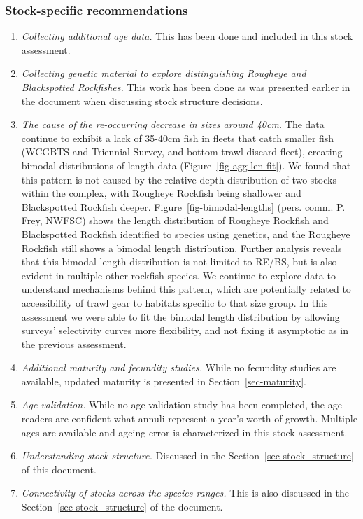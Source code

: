 \documentclass[
]{scrartcl}
\providecommand{\tightlist}{%
  \setlength{\itemsep}{0pt}\setlength{\parskip}{0pt}}\usepackage{longtable,booktabs,array}
\begin{document}
\subsubsection{Stock-specific
recommendations}\label{stock-specific-recommendations}

\begin{enumerate}
\def\labelenumi{\arabic{enumi}.}
\tightlist
\item
  \emph{Collecting additional age data.} This has been done and included
  in this stock assessment.
\item
  \emph{Collecting genetic material to explore distinguishing Rougheye
  and Blackspotted Rockfishes.} This work has been done as was presented
  earlier in the document when discussing stock structure decisions.
\item
  \emph{The cause of the re-occurring decrease in sizes around 40cm.}
  The data continue to exhibit a lack of 35-40cm fish in fleets that
  catch smaller fish (WCGBTS and Triennial Survey, and bottom trawl
  discard fleet), creating bimodal distributions of length data
  (Figure~\ref{fig-agg-len-fit}). We found that this pattern is not
  caused by the relative depth distribution of two stocks within the
  complex, with Rougheye Rockfish being shallower and Blackspotted
  Rockfish deeper. Figure~\ref{fig-bimodal-lengths} (pers. comm. P.
  Frey, NWFSC) shows the length distribution of Rougheye Rockfish and
  Blackspotted Rockfish identified to species using genetics, and the
  Rougheye Rockfish still shows a bimodal length distribution. Further
  analysis reveals that this bimodal length distribution is not limited
  to RE/BS, but is also evident in multiple other rockfish species. We
  continue to explore data to understand mechanisms behind this pattern,
  which are potentially related to accessibility of trawl gear to
  habitats specific to that size group. In this assessment we were able
  to fit the bimodal length distribution by allowing surveys'
  selectivity curves more flexibility, and not fixing it asymptotic as
  in the previous assessment.
\item
  \emph{Additional maturity and fecundity studies.} While no fecundity
  studies are available, updated maturity is presented in
  Section~\ref{sec-maturity}.
\item
  \emph{Age validation.} While no age validation study has been
  completed, the age readers are confident what annuli represent a
  year's worth of growth. Multiple ages are available and ageing error
  is characterized in this stock assessment.
\item
  \emph{Understanding stock structure.} Discussed in the
  Section~\ref{sec-stock_structure} of this document.
\item
  \emph{Connectivity of stocks across the species ranges.} This is also
  discussed in the Section~\ref{sec-stock_structure} of the document.
\end{enumerate}
\end{document}
